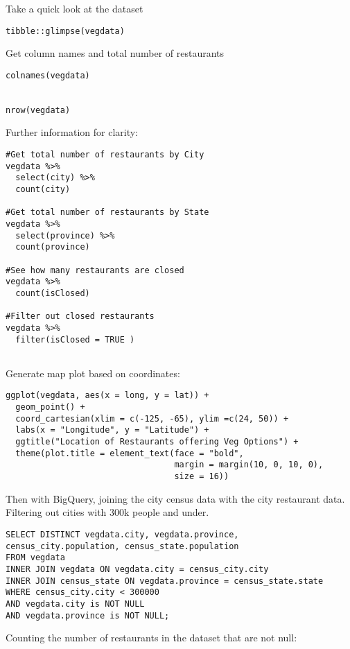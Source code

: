 \documentclass[
]{article}
\begin{document}
Take a quick look at the dataset

\begin{verbatim}
tibble::glimpse(vegdata)
\end{verbatim}

Get column names and total number of restaurants

\begin{verbatim}
colnames(vegdata)


nrow(vegdata)
\end{verbatim}

Further information for clarity:

\begin{verbatim}
#Get total number of restaurants by City
vegdata %>%
  select(city) %>%
  count(city)

#Get total number of restaurants by State
vegdata %>%
  select(province) %>%
  count(province)

#See how many restaurants are closed
vegdata %>%
  count(isClosed)
  
#Filter out closed restaurants
vegdata %>%
  filter(isClosed = TRUE )
  
\end{verbatim}

Generate map plot based on coordinates:

\begin{verbatim}
ggplot(vegdata, aes(x = long, y = lat)) +
  geom_point() +
  coord_cartesian(xlim = c(-125, -65), ylim =c(24, 50)) +
  labs(x = "Longitude", y = "Latitude") +
  ggtitle("Location of Restaurants offering Veg Options") +
  theme(plot.title = element_text(face = "bold",
                                  margin = margin(10, 0, 10, 0), 
                                  size = 16))
\end{verbatim}

Then with BigQuery, joining the city census data with the city
restaurant data. Filtering out cities with 300k people and under.

\begin{verbatim}
SELECT DISTINCT vegdata.city, vegdata.province, census_city.population, census_state.population
FROM vegdata
INNER JOIN vegdata ON vegdata.city = census_city.city
INNER JOIN census_state ON vegdata.province = census_state.state
WHERE census_city.city < 300000
AND vegdata.city is NOT NULL
AND vegdata.province is NOT NULL;
\end{verbatim}

Counting the number of restaurants in the dataset that are not null:
\end{document}

